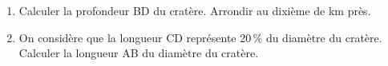 \begin{enumerate}
	\begin{enumerate}
		\item Calculer la profondeur BD du cratère. Arrondir au dixième de km près. 
		\item On considère que la longueur CD représente 20\,\% du diamètre du cratère. Calculer la longueur AB du diamètre du cratère.
	\end{enumerate} 
\end{enumerate} 


